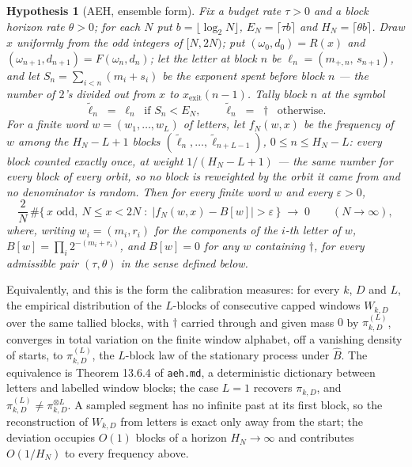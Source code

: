 \documentclass[11pt]{article}
\newtheorem{hypothesis}[theorem]{Hypothesis}
\theoremstyle{remark}
\newcommand{\w}{\omega}
\begin{document}
\begin{hypothesis}[AEH, ensemble form]\label{hyp:aeh}
Fix a \emph{budget rate} $\tau > 0$ and a \emph{block horizon rate} $\theta > 0$;
for each $N$ put $b = \lfloor\log_2 N\rfloor$, $E_N = \lceil \tau b\rceil$
and $H_N = \lceil \theta b\rceil$. Draw $x$ uniformly from the odd integers of
$[N, 2N)$; put $(\w_0,d_0) = R(x)$ and $(\w_{n+1},d_{n+1}) = F(\w_n,d_n)$; let the
\emph{letter} at block $n$ be $\ell_n = (m_{+,n},\,s_{n+1})$, and let
$S_n = \sum_{i<n}(m_i + s_i)$ be the \emph{exponent spent} before block $n$ ---
the number of $2$'s divided out from $x$ to $x_{\mathrm{exit}}(n-1)$. Tally block
$n$ at the symbol
\[
  \tilde\ell_n \;=\; \ell_n \ \text{ if } S_n < E_N, \qquad
  \tilde\ell_n \;=\; \dagger \ \text{ otherwise.}
\]
For a finite word $w = (w_1,\dots,w_L)$ of letters, let $f_N(w,x)$ be the
frequency of $w$ among the $H_N - L + 1$ blocks
$(\tilde\ell_n,\dots,\tilde\ell_{n+L-1})$, $0 \le n \le H_N - L$: every
block counted exactly once, at weight $1/(H_N-L+1)$ --- the same number for
every block of every orbit, so no block is reweighted by the orbit it came from
and no denominator is random. Then for every finite word $w$ and every
$\varepsilon > 0$,
\[
  \frac{2}{N}\,\#\bigl\{\, x \text{ odd},\ N \le x < 2N \;:\;
  \bigl| f_N(w,x) - B[w] \bigr| > \varepsilon \,\bigr\}
  \;\longrightarrow\; 0 \qquad (N \to \infty),
\]
where, writing $w_i = (m_i, r_i)$ for the components of the $i$-th letter of $w$,
$B[w] = \prod_{i} 2^{-(m_i + r_i)}$, and $B[w] = 0$ for any $w$ containing
$\dagger$, for every admissible pair $(\tau,\theta)$ in the sense defined below.
\end{hypothesis}

Equivalently, and this is the form the calibration measures: for every $k$, $D$
and $L$, the empirical distribution of the $L$-blocks of consecutive capped
windows $W_{k,D}$ over the same tallied blocks, with $\dagger$ carried through
and given mass $0$ by $\pi^{(L)}_{k,D}$, converges in total variation on the
finite window alphabet, off a vanishing density of starts, to
$\pi^{(L)}_{k,D}$, the $L$-block law of the stationary process under $\hat B$.
The equivalence is Theorem 13.6.4 of \texttt{aeh.md}, a deterministic dictionary
between letters and labelled window blocks; the case $L = 1$ recovers
$\pi_{k,D}$, and $\pi^{(L)}_{k,D} \neq \pi_{k,D}^{\otimes L}$. A sampled segment
has no infinite past at its first block, so the reconstruction of
$W_{k,D}$ from letters is exact only away from the start; the
deviation occupies $O(1)$ blocks of a horizon $H_N \to \infty$ and contributes
$O(1/H_N)$ to every frequency above.
\end{document}
